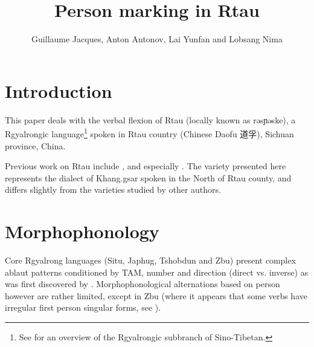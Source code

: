 \documentclass[oldfontcommands,oneside,a4paper,11pt]{article}
\newcommand{\ipa}[1]{{\phon #1}} %
\newcommand{\zh}[1]{{\cn #1}}
\begin{document}
 


\title{Person marking in Rtau} 
\author{Guillaume Jacques, Anton Antonov, Lai Yunfan and Lobsang Nima}

\maketitle

 
 \section{Introduction}


This paper deals with the verbal flexion of   Rtau (locally known as \ipa{rəsɲəske}), a Rgyalrongic language\footnote{See \citet{jackson00sidaba} for an overview of the Rgyalrongic subbranch of Sino-Tibetan.} spoken in Rtau country (Chinese Daofu \zh{道孚}), Sichuan province, China.

Previous work on Rtau include \citet{huangbf91daofu}, \citet{jackson07shangzhai} and especially \citet{sun13gexi}. The variety presented here represents the dialect of Khang.gsar spoken in the North of Rtau county, and differs slightly from the varieties studied by other authors.




\section{Morphophonology}
Core Rgyalrong languages (Situ, Japhug, Tshobdun and Zbu) present complex ablaut patterns conditioned by TAM, number and direction (direct vs. inverse) as was first discovered by  \citet{jackson00sidaba}.  Morphophonological alternations based on person however are rather limited, except in Zbu (where it appears that some verbs have irregular first person singular forms, see \citealt{gongxun12}).
\end{document}
